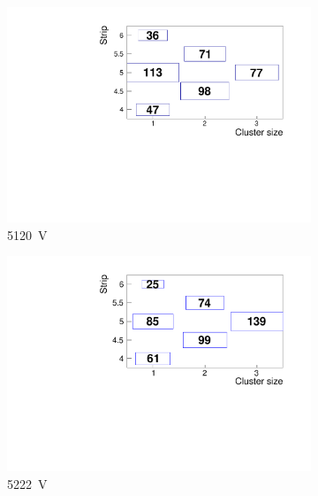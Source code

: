 	\begin{figure}[H]
		\begin{subfigure}{.33\linewidth}
		    \centering
			\includegraphics[width=1.1\linewidth]{fig/chapt6/Muon-ClS-5000-gRPC-INFN.pdf}
			\caption{\label{fig:cluster-size-2D:A} \SI{5120}{V}}
		\end{subfigure}
		\begin{subfigure}{.33\linewidth}
		    \centering
			\includegraphics[width=1.1\linewidth]{fig/chapt6/Muon-ClS-5100-gRPC-INFN.pdf}
			\caption{\label{fig:cluster-size-2D:B} \SI{5222}{V}}
		\end{subfigure}
		\begin{subfigure}{.33\linewidth}
		    \centering

\end{subfigure}
\end{figure}
